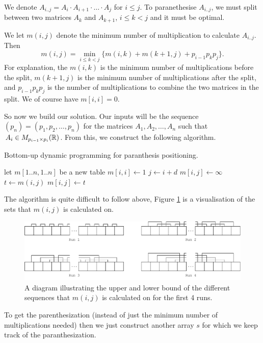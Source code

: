 We denote $A_{i..j} = A_i \cdot A_{i + 1} \cdot \ldots \cdot A_j$ for $i \leq j$. 
To paranethesise $A_{i..j}$, 
we must split between two matrices $A_k$ and $A_{k + 1}$, $i \leq k < j$ and it 
must be optimal.

We let $m(i, j)$ denote the minimum number of multiplication to calculate $A_{i..j}$. 
Then
\[ m(i, j) = \min_{i \leq k < j} \{ m(i, k) + m(k + 1, j) + p_{i - 1}p_kp_j \}. \]
For explanation, 
the $m(i, k)$ is the minimum number of multiplications before the split, 
$m(k + 1, j)$ is the minimum number of multiplications after the split, 
and $p_{i - 1}p_kp_j$ 
is the number of multiplications to combine the two matrices in the split. 
We of course have $m[i, i] = 0$.

So now we build our solution. 
Our inputs will be the sequence $(p_n) = (p_1, p_2, \ldots, p_n)$ 
for the matrices $A_1, A_2, \ldots, A_n$ such that $A_i \in M_{p_{i - 1} \times p_i}(\mathbb{R})$. 
From this, we construct the following algorithm.

\begin{algorithm}
    Bottom-up dynamic programming for paranthesis positioning.
    \begin{algorithmic}[1]
            \State let $m[1..n, 1..n]$ be a new table
                \State $m[i, i] \gets 1$
            \EndFor
                    \State $j \gets i + d$
                    \State $m[i, j] \gets \infty$
                        \State $t \gets m(i, j)$ 
                            \State $m[i, j] \gets t$
                        \EndIf
                    \EndFor
                \EndFor
            \EndFor
        \EndProcedure
    \end{algorithmic}
\end{algorithm}

The algorithm is quite difficult to follow above, 
Figure \ref{fig:matrix-chain-order-ex} is a visualisation of the sets that $m(i, j)$ 
is calculated on.

\begin{figure}
    \centering
    \includegraphics[width=\linewidth]{images/matrix-chain-order-ex.pdf}
    \caption{A diagram illustrating the upper and lower bound of the different sequences that $m(i, j)$ is calculated on for the first 4 runs.}
    \label{fig:matrix-chain-order-ex}
\end{figure}

\begin{remark}
    To get the parenthesization (instead of just the minimum number of multiplications needed) then we just construct another array $s$ for which we keep track of the paranthesization.
\end{remark}
